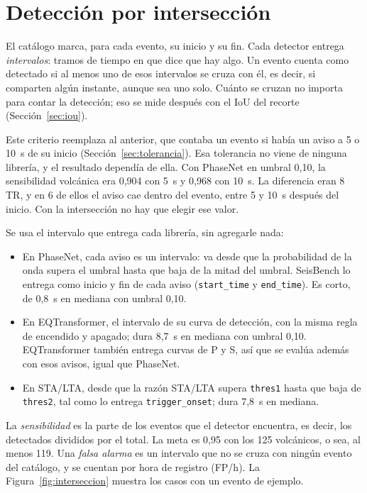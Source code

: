 \documentclass[11pt,a4paper,oneside,spanish,oldfontcommands]{memoir}
\begin{document}
\section{Detección por intersección}\label{sec:interseccion}

El catálogo marca, para cada evento, su inicio y su fin. Cada detector entrega
\emph{intervalos}: tramos de tiempo en que dice que hay algo. Un evento cuenta
como detectado si al menos uno de esos intervalos se cruza con él, es decir, si
comparten algún instante, aunque sea uno solo. Cuánto se cruzan no importa para
contar la detección; eso se mide después con el IoU del recorte
(Sección~\ref{sec:iou}).

Este criterio reemplaza al anterior, que contaba un evento si había un aviso a
5 o 10~s de su inicio (Sección~\ref{sec:tolerancia}). Esa tolerancia no viene
de ninguna librería, y el resultado dependía de ella. Con PhaseNet en umbral
0,10, la sensibilidad volcánica era 0,904 con 5~s y 0,968 con 10~s. La
diferencia eran 8 TR, y en 6 de ellos el aviso cae dentro del evento, entre 5 y
10~s después del inicio. Con la intersección no hay que elegir ese valor.

Se usa el intervalo que entrega cada librería, sin agregarle nada:

\begin{itemize}
\item En PhaseNet, cada aviso es un intervalo: va desde que la probabilidad de
  la onda supera el umbral hasta que baja de la mitad del umbral. SeisBench lo
  entrega como inicio y fin de cada aviso (\texttt{start\_time} y
  \texttt{end\_time}). Es corto, de 0,8~s en mediana con umbral 0,10.
\item En EQTransformer, el intervalo de su curva de detección, con la misma  regla de encendido y apagado; dura 8,7~s en mediana con umbral 0,10.
  EQTransformer también entrega curvas de P y S, así que se evalúa además con
  esos avisos, igual que PhaseNet.
\item En STA/LTA, desde que la razón STA/LTA supera \texttt{thres1} hasta que
  baja de \texttt{thres2}, tal como lo entrega \texttt{trigger\_onset}; dura
  7,8~s en mediana.
\end{itemize}

La \emph{sensibilidad} es la parte de los eventos que el detector encuentra, es decir, los detectados divididos por el total. La meta es 0,95 con los 125 volcánicos, o
sea, al menos 119. Una \emph{falsa alarma} es un intervalo que no se cruza con
ningún evento del catálogo, y se cuentan por hora de registro (FP/h). La
Figura~\ref{fig:interseccion} muestra los casos con un evento de ejemplo.
\end{document}
